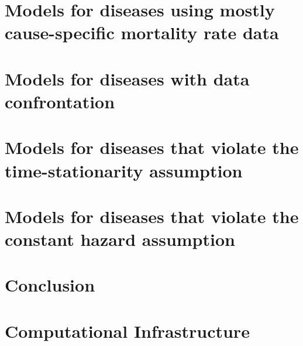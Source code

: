 \chapter[CSMR Driven]{Models for diseases using mostly cause-specific mortality rate data}
\label{chapter:practice-csmr_data}


\chapter[Data Confrontation]{Models for diseases with data confrontation}
\label{chapter:practice-data_confrontation}


\chapter[Time Varying]{Models for diseases that violate the time-stationarity assumption}
\label{chapter:practice-time_varying}


\chapter[Non-constant hazards]{Models for diseases that violate the constant hazard assumption}
\label{chapter:practice-two_stage}




\chapter{Conclusion}



\chapter{Computational Infrastructure}



